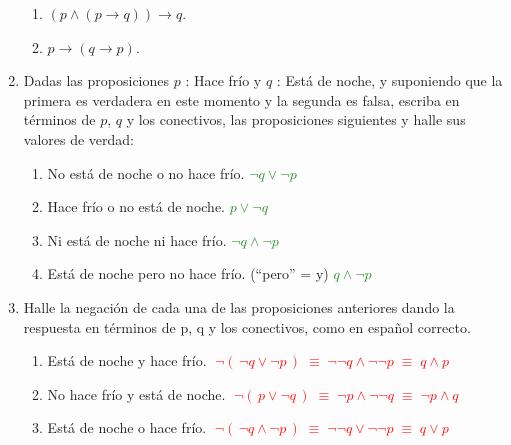 \documentclass[12pt,letterpaper]{exam}
\begin{document}
\begin{enumerate}
\begin{enumerate}[label=\arabic*., itemsep=-2em, topsep=0.2em]
  \item $(p \land (p \to q)) \to q.$
  \begin{center}
  \end{center}
\newpage
  \item $p \to (q \to p).$
  \begin{center}
  \end{center}
\end{enumerate}

\item Dadas las proposiciones $p$ : Hace frío y $q$ : Está de noche, y suponiendo que la primera es verdadera en este 
momento y la segunda es falsa, escriba en términos de $p$, $q$ y los conectivos, las proposiciones siguientes y halle 
sus valores de verdad:
\begin{enumerate}[label=\alph*)]
	\item No está de noche o no hace frío.  \textcolor{ForestGreen}{$\neg q \lor \neg p \quad$}
	\item Hace frío o no está de noche.  \textcolor{ForestGreen}{$p \lor \neg q \quad$}
	\item Ni está de noche ni hace frío.  \textcolor{ForestGreen}{$\neg q \land \neg p \quad $}
	\item Está de noche pero no hace frío. (“pero” = y)  \textcolor{ForestGreen}{$q \land \neg p \quad $}
\end{enumerate}

\item Halle la negación de cada una de las proposiciones anteriores dando la respuesta en términos de p, q y los
 conectivos, como en español correcto.

\begin{enumerate}[label=\alph*)]
  \item Está de noche y hace frío. 
        \textcolor{red}{$\;\neg(\,\neg q \lor \neg p\,)\;\equiv\; \neg\neg q \land \neg\neg p \;\equiv\; q \land p$}

  \item No hace frío y está de noche. 
        \textcolor{red}{$\;\neg(\,p \lor \neg q\,)\;\equiv\; \neg p \land \neg\neg q \;\equiv\; \neg p \land q$}

  \item Está de noche o hace frío. 
        \textcolor{red}{$\;\neg(\,\neg q \land \neg p\,)\;\equiv\; \neg\neg q \lor \neg\neg p \;\equiv\; q \lor p$}


\end{enumerate}
\end{enumerate}
\end{document}
